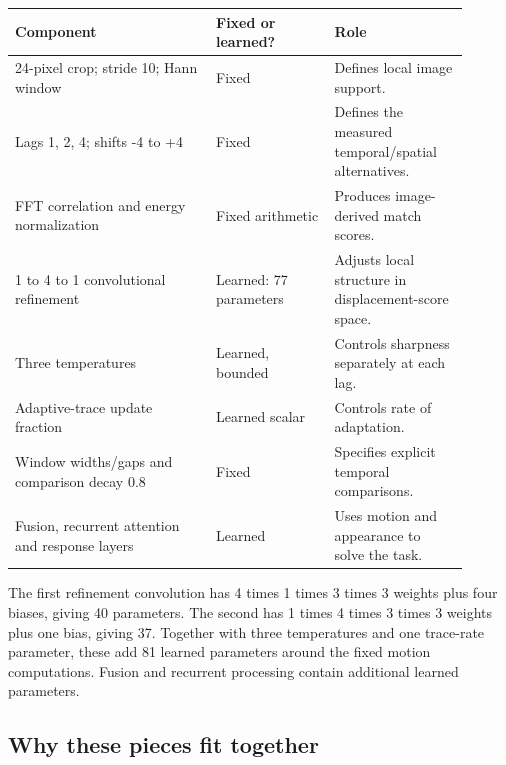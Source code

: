 \documentclass[11pt,letterpaper]{article}
\begin{document}
\begin{center}\small\renewcommand{\arraystretch}{1.16}\setlength{\tabcolsep}{4pt}\begin{tabular}{p{0.395\linewidth}p{0.239\linewidth}p{0.266\linewidth}}\toprule

\textbf{Component} & \textbf{Fixed or learned?} & \textbf{Role} \\

\midrule

24-pixel crop; stride 10; Hann window & Fixed & Defines local image support. \\

Lags 1, 2, 4; shifts -4 to +4 & Fixed & Defines the measured temporal/\allowbreak{}spatial alternatives. \\

FFT correlation and energy normalization & Fixed arithmetic & Produces image-derived match scores. \\

1 to 4 to 1 convolutional refinement & Learned: 77 parameters & Adjusts local structure in displacement-score space. \\

Three temperatures & Learned, bounded & Controls sharpness separately at each lag. \\

Adaptive-trace update fraction & Learned scalar & Controls rate of adaptation. \\

Window widths/\allowbreak{}gaps and comparison decay 0.8 & Fixed & Specifies explicit temporal comparisons. \\

Fusion, recurrent attention and response layers & Learned & Uses motion and appearance to solve the task. \\

\bottomrule\end{tabular}\end{center}

The first refinement convolution has 4 times 1 times 3 times 3 weights plus four biases, giving 40 parameters. The second has 1 times 4 times 3 times 3 weights plus one bias, giving 37. Together with three temperatures and one trace-rate parameter, these add 81 learned parameters around the fixed motion computations. Fusion and recurrent processing contain additional learned parameters.


\subsection*{Why these pieces fit together}
\end{document}
